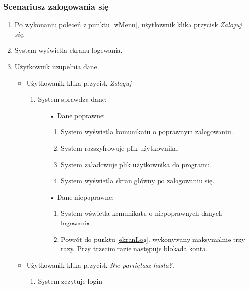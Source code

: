 \documentclass[a4paper]{article}
\begin{document}
\subsubsection{Scenariusz zalogowania się}
\begin{enumerate}
    \item Po wykonaniu poleceń z punktu \ref{wMenu}, użytkownik klika przycisk \textit{Zaloguj się}.
    \item System wyświetla ekranu logowania. \label{ekranLog}
    \item Użytkownik uzupełnia dane.
    \begin{itemize}
        \item Użytkowanik klika przycisk \textit{Zaloguj}.
            \begin{enumerate}
                \item System sprawdza dane:
                \begin{itemize}
                    \item[•] Dane poprawne:
                    \begin{enumerate}
                        \item System wyświetla  komunikatu o poprawnym zalogowaniu.
                        \item System rozszyfrowuje plik użytkownika.
                        \item System załadowuje plik użytkownika do programu.
                        \item System wyświetla ekran główny po zalogowaniu się.
                    \end{enumerate}
                    \item[•] Dane niepoprawne:
                    \begin{enumerate}
                        \item System wświetla komunikatu o niepoprawnych danych logowania.
                        \item Powrót do punktu \ref{ekranLog}. wykonywany maksymalnie trzy razy. Przy trzecim razie następuje blokada konta.
                    \end{enumerate}
                \end{itemize}
            \end{enumerate}
        \item Użytkowanik klika przycisk \textit{Nie pamiętasz hasła?}.
        \begin{enumerate}
            \item System zczytuje login.

\end{enumerate}
\end{itemize}
\end{enumerate}
\end{document}
